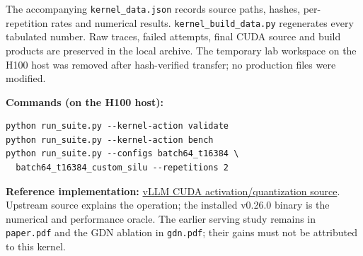 \documentclass[10pt,a4paper]{article}
\begin{document}
The accompanying \texttt{kernel\_data.json} records source paths, hashes,
per-repetition rates and numerical results. \texttt{kernel\_build\_data.py}
regenerates every tabulated number. Raw traces, failed attempts, final CUDA source
and build products are preserved in the local archive. The temporary lab
workspace on the H100 host was removed after hash-verified transfer; no
production files were modified.

\small
\textbf{Commands (on the H100 host):}
\begin{verbatim}
python run_suite.py --kernel-action validate
python run_suite.py --kernel-action bench
python run_suite.py --configs batch64_t16384 \
  batch64_t16384_custom_silu --repetitions 2
\end{verbatim}
\textbf{Reference implementation:}
\href{https://github.com/vllm-project/vllm/blob/main/csrc/libtorch_stable/quantization/fused_kernels/fused_silu_mul_block_quant.cu}{vLLM CUDA activation/quantization source}.
Upstream source explains the operation; the installed v0.26.0 binary is the
numerical and performance oracle. The earlier serving study remains in
\texttt{paper.pdf} and the GDN ablation in \texttt{gdn.pdf}; their gains must
not be attributed to this kernel.
\end{document}
